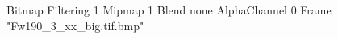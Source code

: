 {Bitmap
	{Filtering 1}
	{Mipmap 1}
	{Blend none}
	{AlphaChannel 0}
	{Frame "Fw190_3_xx_big.tif.bmp"}
}
